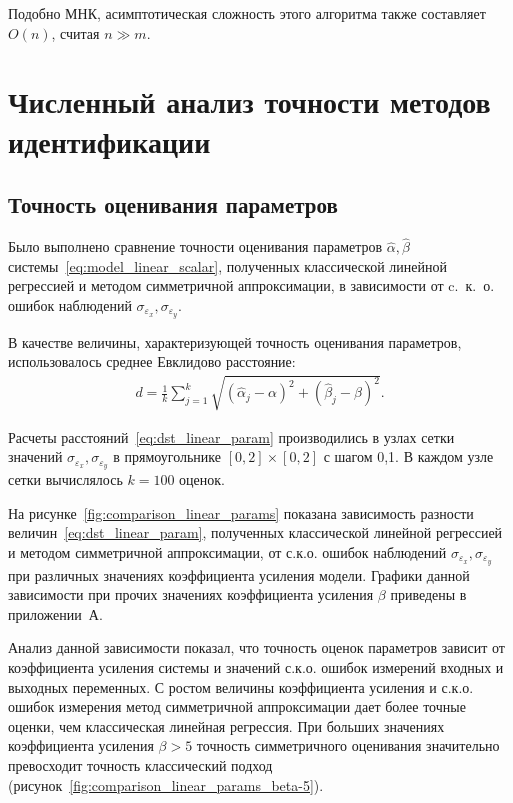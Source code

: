 Подобно МНК, асимптотическая сложность этого алгоритма также составляет \( O(n) \),
считая \( n \gg m \).


\section{Численный анализ точности методов идентификации}

\subsection{Точность оценивания параметров}

Было выполнено сравнение точности оценивания параметров
\( \hat{\alpha}, \hat{\beta} \) системы~\eqref{eq:model_linear_scalar},
полученных классической линейной регрессией и методом симметричной аппроксимации,
в зависимости от c.~к.~о. ошибок наблюдений \( \sigma_{\varepsilon_x}, \sigma_{\varepsilon_y} \).

В качестве величины, характеризующей точность оценивания параметров,
использовалось среднее Евклидово расстояние:
\begin{equation}
  \begin{aligned}
    d = \frac{1}{k} \sum_{j=1}^k \sqrt{(\hat{\alpha}_j - \alpha)^2 + (\hat{\beta}_j - \beta)^2}.
    \end{aligned}
  \label{eq:dst_linear_param}
\end{equation}

Расчеты расстояний~\eqref{eq:dst_linear_param} производились в узлах сетки значений
\( \sigma_{\varepsilon_x}, \sigma_{\varepsilon_y} \) в прямоугольнике
\( [0, 2] \times [0, 2] \) с шагом 0{,}1.
В каждом узле сетки вычислялось \( k = 100 \) оценок.

На рисунке~\ref{fig:comparison_linear_params}
показана зависимость разности величин~\eqref{eq:dst_linear_param},
полученных классической линейной регрессией и методом симметричной аппроксимации,
от с.к.о. ошибок наблюдений \( \sigma_{\varepsilon_x}, \sigma_{\varepsilon_y} \) при
различных значениях коэффициента усиления модели.
Графики данной зависимости при прочих значениях коэффициента усиления \( \beta \)
приведены в приложении~А.

Анализ данной зависимости показал, что
точность оценок параметров зависит от коэффициента усиления системы и
значений с.к.о. ошибок измерений входных и выходных переменных.
С ростом величины коэффициента усиления и с.к.о. ошибок измерения
метод симметричной аппроксимации дает более точные оценки,
чем классическая линейная регрессия.
При больших значениях коэффициента усиления \( \beta > 5 \)
точность симметричного оценивания значительно превосходит
точность классический подход (рисунок~\ref{fig:comparison_linear_params_beta-5}).

